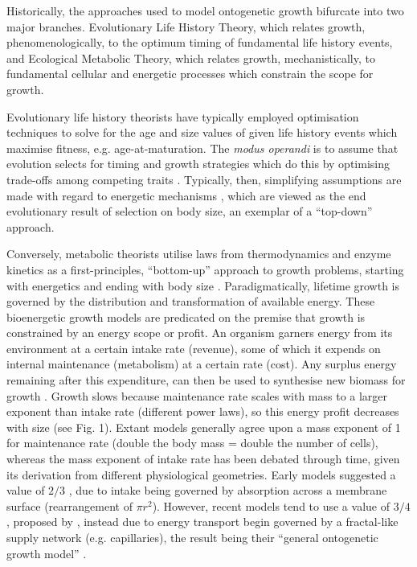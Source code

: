 \documentclass[a4paper]{article} %
\begin{document}
    Historically, the approaches used to model ontogenetic growth bifurcate into two major branches. Evolutionary Life History Theory, which relates growth, phenomenologically, to the optimum timing of fundamental life history events, and Ecological Metabolic Theory, which relates growth, mechanistically, to fundamental cellular and energetic processes which constrain the scope for growth.
        
    Evolutionary life history theorists have typically employed optimisation techniques to solve for the age and size values of given life history events which maximise fitness, e.g. age-at-maturation. The \textit{modus operandi} is to assume that evolution selects for timing and growth strategies which do this by optimising trade-offs among competing traits \autocite{Day1997, Stearns1989, stearns1992evolution}. Typically, then, simplifying assumptions are made with regard to energetic mechanisms \autocite{Day1997, Kozowski1987-indeterminate}, which are viewed as the end evolutionary result of selection on body size, an exemplar of a ``top-down'' approach.
        
    Conversely, metabolic theorists utilise laws from thermodynamics and enzyme kinetics as a first-principles, ``bottom-up'' approach to growth problems, starting with energetics and ending with body size \autocite{Brown2004}. Paradigmatically, lifetime growth is governed by the distribution and transformation of available energy. These bioenergetic growth models are predicated on the premise that growth is constrained by an energy scope or profit. An organism garners energy from its environment at a certain intake rate (revenue), some of which it expends on internal maintenance (metabolism) at a certain rate (cost). Any surplus energy remaining after this expenditure, can then be used to synthesise new biomass for growth \autocite{Holdway1984, Rochet2001, Enberg2012, VanGemert2019}. Growth slows because maintenance rate scales with mass to a larger exponent than intake rate (different power laws), so this energy profit decreases with size (see Fig. 1). Extant models generally agree upon a mass exponent of 1 for maintenance rate (double the body mass = double the number of cells), whereas the mass exponent of intake rate has been debated through time, given its derivation from different physiological geometries. Early models suggested a value of $2/3$ \autocite{Putter1920,vonBert1938, VonBertalanffy1957}, due to intake being governed by absorption across a membrane surface (rearrangement of $\pi r^2$). However, recent models tend to use a value of $3/4$, proposed by \textcite{West1997}, instead due to energy transport begin governed by a fractal-like supply network (e.g. capillaries), the result being their ``general ontogenetic growth model'' \autocite{West2001}.
\end{document}
